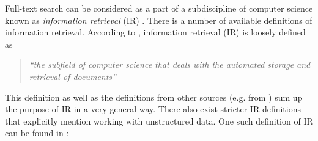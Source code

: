 

















Full-text search can be considered as a part of a subdiscipline of computer science known
as \textit{information retrieval} (IR) \cite{Witten:1999:MGC:323905}.
There is a number of available definitions of information retrieval.
According to \cite{IRDataAlgorithms}, information
retrieval (IR) is loosely defined as

	\begin{quote}
		\textsl{``the subfield of computer science
	that deals with the automated storage and retrieval of documents''}
	\end{quote}

This definition as well as the definitions from other sources (e.g. from \cite{Witten:1999:MGC:323905}) sum up the purpose of IR in a very general way.
There also exist stricter IR definitions that explicitly mention working with unstructured data.
One such definition of IR can be found in \cite{ManningRaghavanSchuetze08}:


